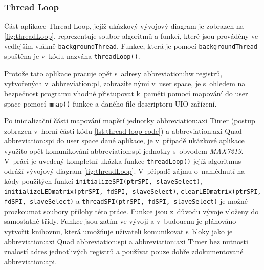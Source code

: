 \documentclass[a4paper, twoside, 11pt]{article}
\newcommand{\fbar}{\FloatBarrier}
\begin{document}
 	\fbar
 	\subsubsection{Thread Loop}\label{subsubsec:thread-loop}
 		Část aplikace Thread Loop, jejíž ukázkový vývojový diagram je zobrazen na \ref{fig:threadLoop}, reprezentuje soubor algoritmů a funkcí, které jsou prováděny ve vedlejším vlákně \texttt{backgroundThread}. Funkce, která je pomocí \texttt{backgroundThread} spuštěna je v~kódu nazvána \texttt{threadLoop()}.\par
		Protože tato aplikace pracuje opět s~adresy \gls{abbreviation:hw} registrů, vytvořených v~\gls{abbreviation:pl}, zobrazitelnými v~user space, je s~ohledem na bezpečnost programu vhodné přistupovat k~paměti pomocí mapování do user space pomocí \texttt{mmap()} funkce a daného file descriptoru UIO zařízení.\par
		Po inicializační části mapování mapětí jednotky \gls{abbreviation:axi} Timer (postup zobrazen v~horní části kódu \ref{lst:thread-loop-code}) a \gls{abbreviation:axi} Quad \gls{abbreviation:spi} do user space dané aplikace, je v~případě ukázkové aplikace využito opět komunikování \gls{abbreviation:spi} jednotky s~obvodem \textit{MAX7219}. V~práci je uvedený kompletní ukázka funkce \texttt{threadLoop()} jejíž algoritmus odráží vývojový diagram \ref{fig:threadLoop}. V~případě zájmu o~nahlédnutí na kódy použitých funkcí \texttt{initializeSPI(ptrSPI, slaveSelect)}, \texttt{initializeLEDmatrix(ptrSPI, fdSPI, slaveSelect)}, \texttt{clearLEDmatrix(ptrSPI, fdSPI, slaveSelect)} a \texttt{threadSPI(ptrSPI, fdSPI, slaveSelect)} je možné prozkoumat soubory přílohy této práce. Funkce jsou z~důvodu vývoje vloženy do samostatné třídy. Funkce jsou zatím ve vývoji a v~budoucnu je plánováno vytvořit knihovnu, která umožňuje uživateli komunikovat s~bloky jako je \gls{abbreviation:axi} Quad \gls{abbreviation:spi} a \gls{abbreviation:axi} Timer bez nutnosti znalostí adres jednotlivých registrů a používat pouze dobře zdokumentované \gls{abbreviation:api}.
\end{document}
